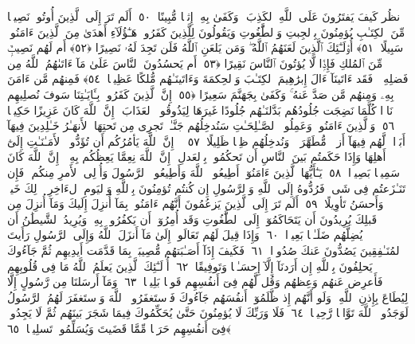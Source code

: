  ٱنظُر كَيفَ يَفتَرُونَ عَلَى ٱللَّهِ ٱلكَذِبَ ۖ وَكَفَىٰ بِهِۦٓ إِثمًۭا مُّبِينًا ﴿٥٠﴾
 أَلَم تَرَ إِلَى ٱلَّذِينَ أُوتُوا۟ نَصِيبًۭا مِّنَ ٱلكِتَـٰبِ يُؤمِنُونَ بِٱلجِبتِ وَٱلطَّٰغُوتِ وَيَقُولُونَ لِلَّذِينَ كَفَرُوا۟ هَـٰٓؤُلَآءِ أَهدَىٰ مِنَ ٱلَّذِينَ ءَامَنُوا۟ سَبِيلًا ﴿٥١﴾
 أُو۟لَـٰٓئِكَ ٱلَّذِينَ لَعَنَهُمُ ٱللَّهُ ۖ وَمَن يَلعَنِ ٱللَّهُ فَلَن تَجِدَ لَهُۥ نَصِيرًا ﴿٥٢﴾
 أَم لَهُم نَصِيبٌۭ مِّنَ ٱلمُلكِ فَإِذًۭا لَّا يُؤتُونَ ٱلنَّاسَ نَقِيرًا ﴿٥٣﴾
 أَم يَحسُدُونَ ٱلنَّاسَ عَلَىٰ مَآ ءَاتَىٰهُمُ ٱللَّهُ مِن فَضلِهِۦ ۖ فَقَد ءَاتَينَآ ءَالَ إِبرَٰهِيمَ ٱلكِتَـٰبَ وَٱلحِكمَةَ وَءَاتَينَـٰهُم مُّلكًا عَظِيمًۭا ﴿٥٤﴾
 فَمِنهُم مَّن ءَامَنَ بِهِۦ وَمِنهُم مَّن صَدَّ عَنهُ ۚ وَكَفَىٰ بِجَهَنَّمَ سَعِيرًا ﴿٥٥﴾
 إِنَّ ٱلَّذِينَ كَفَرُوا۟ بِـَٔايَـٰتِنَا سَوفَ نُصلِيهِم نَارًۭا كُلَّمَا نَضِجَت جُلُودُهُم بَدَّلنَـٰهُم جُلُودًا غَيرَهَا لِيَذُوقُوا۟ ٱلعَذَابَ ۗ إِنَّ ٱللَّهَ كَانَ عَزِيزًا حَكِيمًۭا ﴿٥٦﴾
 وَٱلَّذِينَ ءَامَنُوا۟ وَعَمِلُوا۟ ٱلصَّـٰلِحَـٰتِ سَنُدخِلُهُم جَنَّـٰتٍۢ تَجرِى مِن تَحتِهَا ٱلأَنهَـٰرُ خَـٰلِدِينَ فِيهَآ أَبَدًۭا ۖ لَّهُم فِيهَآ أَزوَٟجٌۭ مُّطَهَّرَةٌۭ ۖ وَنُدخِلُهُم ظِلًّۭا ظَلِيلًا ﴿٥٧﴾
 ۞ إِنَّ ٱللَّهَ يَأمُرُكُم أَن تُؤَدُّوا۟ ٱلأَمَـٰنَـٰتِ إِلَىٰٓ أَهلِهَا وَإِذَا حَكَمتُم بَينَ ٱلنَّاسِ أَن تَحكُمُوا۟ بِٱلعَدلِ ۚ إِنَّ ٱللَّهَ نِعِمَّا يَعِظُكُم بِهِۦٓ ۗ إِنَّ ٱللَّهَ كَانَ سَمِيعًۢا بَصِيرًۭا ﴿٥٨﴾
 يَـٰٓأَيُّهَا ٱلَّذِينَ ءَامَنُوٓا۟ أَطِيعُوا۟ ٱللَّهَ وَأَطِيعُوا۟ ٱلرَّسُولَ وَأُو۟لِى ٱلأَمرِ مِنكُم ۖ فَإِن تَنَـٰزَعتُم فِى شَىءٍۢ فَرُدُّوهُ إِلَى ٱللَّهِ وَٱلرَّسُولِ إِن كُنتُم تُؤمِنُونَ بِٱللَّهِ وَٱليَومِ ٱلءَاخِرِ ۚ ذَٟلِكَ خَيرٌۭ وَأَحسَنُ تَأوِيلًا ﴿٥٩﴾
 أَلَم تَرَ إِلَى ٱلَّذِينَ يَزعُمُونَ أَنَّهُم ءَامَنُوا۟ بِمَآ أُنزِلَ إِلَيكَ وَمَآ أُنزِلَ مِن قَبلِكَ يُرِيدُونَ أَن يَتَحَاكَمُوٓا۟ إِلَى ٱلطَّٰغُوتِ وَقَد أُمِرُوٓا۟ أَن يَكفُرُوا۟ بِهِۦ وَيُرِيدُ ٱلشَّيطَٰنُ أَن يُضِلَّهُم ضَلَـٰلًۢا بَعِيدًۭا ﴿٦٠﴾
 وَإِذَا قِيلَ لَهُم تَعَالَوا۟ إِلَىٰ مَآ أَنزَلَ ٱللَّهُ وَإِلَى ٱلرَّسُولِ رَأَيتَ ٱلمُنَـٰفِقِينَ يَصُدُّونَ عَنكَ صُدُودًۭا ﴿٦١﴾
 فَكَيفَ إِذَآ أَصَـٰبَتهُم مُّصِيبَةٌۢ بِمَا قَدَّمَت أَيدِيهِم ثُمَّ جَآءُوكَ يَحلِفُونَ بِٱللَّهِ إِن أَرَدنَآ إِلَّآ إِحسَـٰنًۭا وَتَوفِيقًا ﴿٦٢﴾
 أُو۟لَـٰٓئِكَ ٱلَّذِينَ يَعلَمُ ٱللَّهُ مَا فِى قُلُوبِهِم فَأَعرِض عَنهُم وَعِظهُم وَقُل لَّهُم فِىٓ أَنفُسِهِم قَولًۢا بَلِيغًۭا ﴿٦٣﴾
 وَمَآ أَرسَلنَا مِن رَّسُولٍ إِلَّا لِيُطَاعَ بِإِذنِ ٱللَّهِ ۚ وَلَو أَنَّهُم إِذ ظَّلَمُوٓا۟ أَنفُسَهُم جَآءُوكَ فَٱستَغفَرُوا۟ ٱللَّهَ وَٱستَغفَرَ لَهُمُ ٱلرَّسُولُ لَوَجَدُوا۟ ٱللَّهَ تَوَّابًۭا رَّحِيمًۭا ﴿٦٤﴾
 فَلَا وَرَبِّكَ لَا يُؤمِنُونَ حَتَّىٰ يُحَكِّمُوكَ فِيمَا شَجَرَ بَينَهُم ثُمَّ لَا يَجِدُوا۟ فِىٓ أَنفُسِهِم حَرَجًۭا مِّمَّا قَضَيتَ وَيُسَلِّمُوا۟ تَسلِيمًۭا ﴿٦٥﴾
